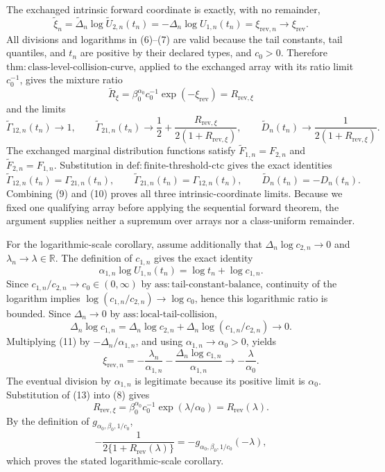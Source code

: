 The exchanged intrinsic forward coordinate is exactly, with no remainder,
\[
\widetilde\xi_n
=\widetilde\Delta_n\log\widetilde U_{2,n}(t_n)
=-\Delta_n\log U_{1,n}(t_n)
=\xi_{\mathrm{rev},n}
\longrightarrow\xi_{\mathrm{rev}}.
\tag{7}
\]
All divisions and logarithms in (6)--(7) are valid because the tail constants, tail quantiles, and \(t_n\) are positive by their declared types, and \(c_0>0\). Therefore \(\mathrm{thm{:}class\text{-}level\text{-}collision\text{-}curve}\), applied to the exchanged array with its ratio limit \(c_0^{-1}\), gives the mixture ratio
\[
\widetilde R_{\xi}
=\beta_0^{\alpha_0}c_0^{-1}\exp(-\xi_{\mathrm{rev}})
=R_{\mathrm{rev},\xi}
\tag{8}
\]
and the limits
\[
\widetilde\Gamma_{12,n}(t_n)\longrightarrow1,
\qquad
\widetilde\Gamma_{21,n}(t_n)\longrightarrow
\frac12+\frac{R_{\mathrm{rev},\xi}}{2(1+R_{\mathrm{rev},\xi})},
\qquad
\widetilde D_n(t_n)\longrightarrow
\frac{1}{2(1+R_{\mathrm{rev},\xi})}.
\tag{9}
\]
The exchanged marginal distribution functions satisfy \(\widetilde F_{1,n}=F_{2,n}\) and \(\widetilde F_{2,n}=F_{1,n}\). Substitution in \(\mathrm{def{:}finite\text{-}threshold\text{-}ctc}\) gives the exact identities
\[
\widetilde\Gamma_{12,n}(t_n)=\Gamma_{21,n}(t_n),
\qquad
\widetilde\Gamma_{21,n}(t_n)=\Gamma_{12,n}(t_n),
\qquad
\widetilde D_n(t_n)=-D_n(t_n).
\tag{10}
\]
Combining (9) and (10) proves all three intrinsic-coordinate limits. Because we fixed one qualifying array before applying the sequential forward theorem, the argument supplies neither a supremum over arrays nor a class-uniform remainder.

For the logarithmic-scale corollary, assume additionally that \(\Delta_n\log c_{2,n}\to0\) and \(\lambda_n\to\lambda\in\mathbb R\). The definition of \(c_{1,n}\) gives the exact identity
\[
\alpha_{1,n}\log U_{1,n}(t_n)=\log t_n+\log c_{1,n}.
\tag{11}
\]
Since \(c_{1,n}/c_{2,n}\to c_0\in(0,\infty)\) by \(\mathrm{ass{:}tail\text{-}constant\text{-}balance}\), continuity of the logarithm implies \(\log(c_{1,n}/c_{2,n})\to\log c_0\), hence this logarithmic ratio is bounded. Since \(\Delta_n\to0\) by \(\mathrm{ass{:}local\text{-}tail\text{-}collision}\),
\[
\Delta_n\log c_{1,n}
=\Delta_n\log c_{2,n}
+\Delta_n\log(c_{1,n}/c_{2,n})
\longrightarrow0.
\tag{12}
\]
Multiplying (11) by \(-\Delta_n/\alpha_{1,n}\), and using \(\alpha_{1,n}\to\alpha_0>0\), yields
\[
\xi_{\mathrm{rev},n}
=-\frac{\lambda_n}{\alpha_{1,n}}
-\frac{\Delta_n\log c_{1,n}}{\alpha_{1,n}}
\longrightarrow-\frac{\lambda}{\alpha_0}.
\tag{13}
\]
The eventual division by \(\alpha_{1,n}\) is legitimate because its positive limit is \(\alpha_0\). Substitution of (13) into (8) gives
\[
R_{\mathrm{rev},\xi}
=\beta_0^{\alpha_0}c_0^{-1}\exp(\lambda/\alpha_0)
=R_{\mathrm{rev}}(\lambda).
\tag{14}
\]
By the definition of \(g_{\alpha_0,\beta_0,1/c_0}\),
\[
-\frac{1}{2\{1+R_{\mathrm{rev}}(\lambda)\}}
=-g_{\alpha_0,\beta_0,1/c_0}(-\lambda),
\tag{15}
\]
which proves the stated logarithmic-scale corollary.

